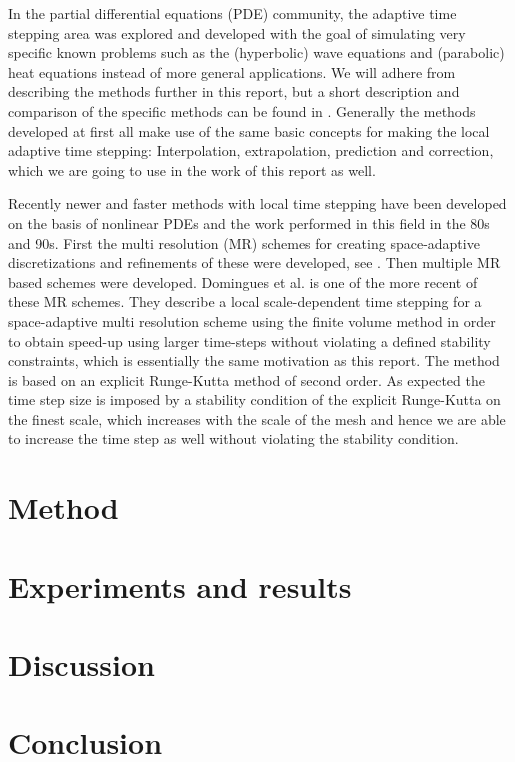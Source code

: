 \documentclass[11pt,a4paper]{article}
\begin{document}
In the partial differential equations (PDE) community, the adaptive time
stepping area was explored and developed with the goal of simulating
very specific known problems such as the (hyperbolic) wave equations
and (parabolic) heat equations instead of more general applications. We
will adhere from describing the methods further in this report, but a
short description and comparison of the specific methods can be found in
\cite{Gander:2013}. Generally the methods developed at first all make use
of the same basic concepts for making the local adaptive time stepping:
Interpolation, extrapolation, prediction and correction, which we are going to
use in the work of this report as well.

Recently newer and faster methods with local time stepping have been developed
on the basis of nonlinear PDEs and the work performed in this field in
the 80s and 90s. First the multi resolution (MR) schemes for creating
space-adaptive discretizations and refinements of these were developed, see
\cite{Berger:1984}. Then multiple MR based schemes were developed. Domingues
et al. \cite{Domingues:2008} is one of the more recent of these MR schemes.
They describe a local scale-dependent time stepping for a space-adaptive multi
resolution scheme using the finite volume method in order to obtain speed-up
using larger time-steps without violating a defined stability constraints,
which is essentially the same motivation as this report. The method is based
on an explicit Runge-Kutta method of second order. As expected the time step
size is imposed by a stability condition of the explicit Runge-Kutta on the
finest scale, which increases with the scale of the mesh and hence we are able
to increase the time step as well without violating the stability condition.

\section{Method}

\section{Experiments and results}

\section{Discussion}

\section{Conclusion}


\cite{Keshav:2007}


\end{document}
